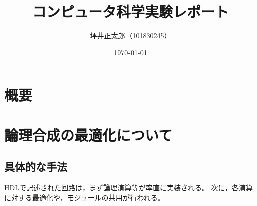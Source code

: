 \documentclass[a4paper,15pt]{jsarticle}
\begin{document}
\title{コンピュータ科学実験レポート}
\author{坪井正太郎（101830245）}
\date{\today}
\maketitle
\section*{概要}


% 

% 

% 

% 

% 

\section{論理合成の最適化について}
\subsection{具体的な手法}
HDLで記述された回路は，まず論理演算等が率直に実装される。
次に，各演算に対する最適化や，モジュールの共用が行われる。
\end{document}

